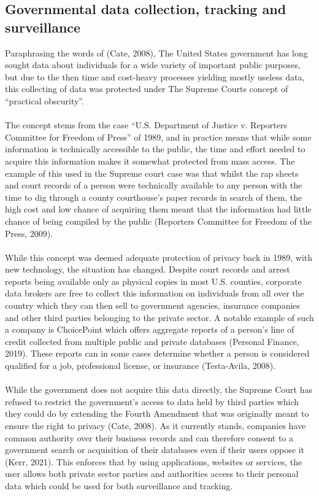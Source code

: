 \documentclass[11pt]{article}
\begin{document}
\subsection{Governmental data collection, tracking and surveillance}
Paraphrasing the words of (Cate, 2008), The United States government has long sought data about individuals for a wide variety of important public purposes, but due to the then time and cost-heavy processes yielding mostly useless data, this collecting of data was protected under The Supreme Courts concept of “practical obscurity”. 
\\ \\
The concept stems from the case “U.S. Department of Justice v. Reporters Committee for Freedom of Press” of 1989, and in practice means that while some information is technically accessible to the public, the time and effort needed to acquire this information makes it somewhat protected from mass access. The example of this used in the Supreme court case was that whilst the rap sheets and court records of a person were technically available to any person with the time to dig through a county courthouse’s paper records in search of them, the high cost and low chance of acquiring them meant that the information had little chance of being compiled by the public (Reporters Committee for Freedom of the Press, 2009). 
\\ \\
While this concept was deemed adequate protection of privacy back in 1989, with new technology, the situation has changed. Despite court records and arrest reports being available only as physical copies in most U.S. counties, corporate data brokers are free to collect this information on individuals from all over the country which they can then sell to government agencies, insurance companies and other third parties belonging to the private sector. A notable example of such a company is ChoicePoint which offers aggregate reports of a person’s line of credit collected from multiple public and private databases (Personal Finance, 2019). These reports can in some cases determine whether a person is considered qualified for a job, professional license, or insurance (Testa-Avila, 2008).
\\ \\
While the government does not acquire this data directly, the Supreme Court has refused to restrict the government’s access to data held by third parties which they could do by extending the Fourth Amendment that was originally meant to ensure the right to privacy (Cate, 2008). As it currently stands, companies have common authority over their business records and can therefore consent to a government search or acquisition of their databases even if their users oppose it (Kerr, 2021).
This enforces that by using applications, websites or services, the user allows both private sector parties and authorities access to their personal data which could be used for both surveillance and tracking.
\end{document}
